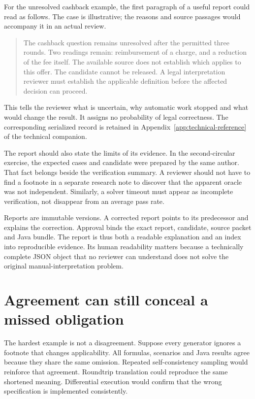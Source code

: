 For the unresolved cashback example, the first paragraph of a useful report
could read as follows. The case is illustrative; the reasons and source passages
would accompany it in an actual review.

\begin{quote}
The cashback question remains unresolved after the permitted three rounds.
Two readings remain: reimbursement of a charge, and a reduction of the fee
itself. The available source does not establish which applies to this offer.
The candidate cannot be released. A legal interpretation reviewer must establish
the applicable definition before the affected decision can proceed.
\end{quote}

This tells the reviewer what is uncertain, why automatic work stopped and what
would change the result. It assigns no probability of legal correctness.
The corresponding serialized record is retained in
Appendix~\ref{app:technical-reference} of the technical companion.


The report should also state the limits of its evidence. In the second-circular
exercise, the expected cases and candidate were prepared by the same author.
That fact belongs beside the verification summary. A reviewer should not have to
find a footnote in a separate research note to discover that the apparent oracle
was not independent. Similarly, a solver timeout must appear as incomplete
verification, not disappear from an average pass rate.

Reports are immutable versions. A corrected report points to its predecessor and
explains the correction. Approval binds the exact report, candidate, source
packet and Java bundle. The report is thus both a readable explanation and an
index into reproducible evidence. Its human readability matters because a
technically complete JSON object that no reviewer can understand does not solve
the original manual-interpretation problem.

\section{Agreement can still conceal a missed obligation}
\label{merge:M06:23}


The hardest example is not a disagreement. Suppose every generator ignores a
footnote that changes applicability. All formulas, scenarios and Java results
agree because they share the same omission. Repeated self-consistency sampling
would reinforce that agreement. Roundtrip translation could reproduce the same
shortened meaning. Differential execution would confirm that the wrong
specification is implemented consistently.

